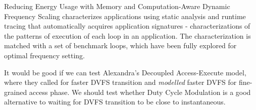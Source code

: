 Reducing Energy Usage with Memory and Computation-Aware Dynamic Frequency Scaling
characterizes applications using static analysis and runtime tracing that automatically
acquires application signatures - characterizations of the patterns of execution of 
each loop in an application. The characterization is matched with a set of benchmark 
loops, which have been fully explored for optimal frequency setting. 

It would be good if we can test Alexandra's Decoupled Access-Execute model, 
where they called for faster DVFS transition and \textit{modelled} faster DVFS 
for fine-grained access phase. 
We should test whether Duty Cycle Modulation is a good alternative to waiting for 
DVFS transition to be close to instantaneous. 

